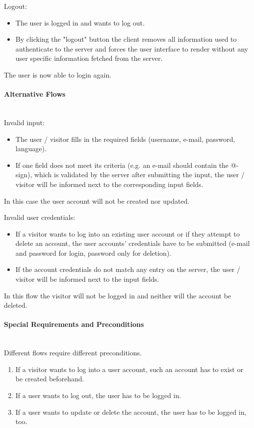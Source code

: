 \noindent
Logout:
\begin{itemize}
	\vspace{-3mm}
	\setlength\itemsep{-1em}
	\item The user is logged in and wants to log out.
	\item By clicking the "logout" button the client removes all information used to authenticate to the server and forces the user interface to render without any user specific information fetched from the server.
\end{itemize}
The user is now able to login again.

\paragraph*{Alternative Flows}\mbox{}\\

\noindent
Invalid input: 
\begin{itemize}
	\vspace{-3mm}
	\setlength\itemsep{-1em}
	\item The user / visitor fills in the required fields (username, e-mail, password, language).
	\item If one field does not meet its criteria (e.g. an e-mail should contain the @-sign), which is validated by the server after submitting the input, the user / visitor will be informed next to the corresponding input fields.
\end{itemize} 
In this case the user account will not be created nor updated.

\noindent
Invalid user credentials:
\begin{itemize}
	\vspace{-3mm}
	\setlength\itemsep{-1em}
	\item If a visitor wants to log into an existing user account or if they attempt to delete an account, the user accounts' credentials have to be submitted (e-mail and password for login, password only for deletion).
	\item If the account credentials do not match any entry on the server, the user / visitor will be informed next to the input fields.
\end{itemize}
In this flow the visitor will not be logged in and neither will the account be deleted.

\paragraph*{Special Requirements and Preconditions}\mbox{}\\
Different flows require different preconditions.
\begin{enumerate}
	\vspace{-3mm}
	\setlength\itemsep{-1em}
	\item If a visitor wants to log into a user account, such an account has to exist or be created beforehand.
	\item If a user wants to log out, the user has to be logged in.
	\item If a user wants to update or delete the account, the user has to be logged in, too.
\end{enumerate}

